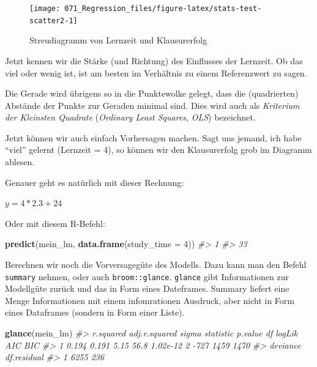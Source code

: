 \documentclass[12pt,ngerman,]{book}
\makeatletter
\newenvironment{Shaded}{\begin{snugshade}}{\end{snugshade}}
\newcommand{\KeywordTok}[1]{\textcolor[rgb]{0.13,0.29,0.53}{\textbf{#1}}}
\newcommand{\DataTypeTok}[1]{\textcolor[rgb]{0.13,0.29,0.53}{#1}}
\newcommand{\DecValTok}[1]{\textcolor[rgb]{0.00,0.00,0.81}{#1}}
\newcommand{\CommentTok}[1]{\textcolor[rgb]{0.56,0.35,0.01}{\textit{#1}}}
\newcommand{\NormalTok}[1]{#1}
\newenvironment{kframe}{%
\medskip{}
\setlength{\fboxsep}{.8em}
 \def\at@end@of@kframe{}%
 \ifinner\ifhmode%
  \def\at@end@of@kframe{\end{minipage}}%
  \begin{minipage}{\columnwidth}%
 \fi\fi%
 \def\FrameCommand##1{\hskip\@totalleftmargin \hskip-\fboxsep
 \colorbox{shadecolor}{##1}\hskip-\fboxsep
     \hskip-\linewidth \hskip-\@totalleftmargin \hskip\columnwidth}%
 \MakeFramed {\advance\hsize-\width
   \@totalleftmargin\z@ \linewidth\hsize
   \@setminipage}}%
 {\par\unskip\endMakeFramed%
 \at@end@of@kframe}
\renewenvironment{Shaded}{\begin{kframe}}{\end{kframe}}
\theoremstyle{definition}
\theoremstyle{definition}
\theoremstyle{remark}
\makeatother
\begin{document}
\begin{figure}

{\centering \texttt{[image: 071\_Regression\_files/figure-latex/stats-test-scatter2-1]} 

}

\caption{Streudiagramm von Lernzeit und Klausurerfolg}\label{fig:stats-test-scatter2}
\end{figure}

Jetzt kennen wir die Stärke (und Richtung) des Einflusses der Lernzeit.
Ob das viel oder wenig ist, ist am besten im Verhältnis zu einem
Referenzwert zu sagen.

Die Gerade wird übrigens so in die Punktewolke gelegt, dass die
(quadrierten) Abstände der Punkte zur Geraden minimal sind. Dies wird
auch als \emph{Kriterium der Kleinsten
Quadrate} (\emph{Ordinary Least
Squares}, \emph{OLS}) bezeichnet.

Jetzt können wir auch einfach Vorhersagen machen. Sagt uns jemand, ich
habe ``viel'' gelernt (Lernzeit = 4), so können wir den Klausurerfolg
grob im Diagramm ablesen.

Genauer geht es natürlich mit dieser Rechnung:

\(y = 4*2.3 + 24\)

Oder mit diesem R-Befehl:

\begin{Shaded}
\begin{Highlighting}[]
\KeywordTok{predict}\NormalTok{(mein_lm, }\KeywordTok{data.frame}\NormalTok{(}\DataTypeTok{study_time =} \DecValTok{4}\NormalTok{))}
\CommentTok{#>  1 }
\CommentTok{#> 33}
\end{Highlighting}
\end{Shaded}

Berechnen wir noch die Vorversagegüte des Modells. Dazu kann man den
Befehl \texttt{summary} nehmen, oder auch \texttt{broom::glance}.
\texttt{glance} gibt Informationen zur Modellgüte zurück und das in Form
eines Dateframes. Summary liefert eine Menge Informationen mit einem
infomrationen Ausdruck, aber nicht in Form eines Dataframes (sondern in
Form einer Liste).

\begin{Shaded}
\begin{Highlighting}[]
\KeywordTok{glance}\NormalTok{(mein_lm)}
\CommentTok{#>   r.squared adj.r.squared sigma statistic  p.value df logLik  AIC  BIC}
\CommentTok{#> 1     0.194         0.191  5.15      56.8 1.02e-12  2   -727 1459 1470}
\CommentTok{#>   deviance df.residual}
\CommentTok{#> 1     6255         236}
\end{Highlighting}
\end{Shaded}
\end{document}

